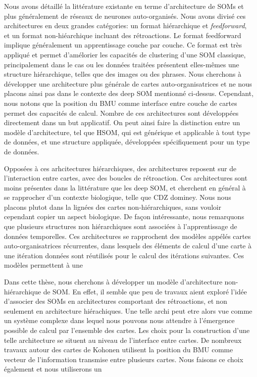 \documentclass[../main]{subfiles}
\begin{document}
Nous avons détaillé la littérature existante en terme d'architecture de SOMs et plus généralement de réseaux de neurones auto-organisés. Nous avons divisé ces architectures en deux grandes catégories: un format hiérarchique et \emph{feedforward}, et un format non-hiéarchique incluant des rétroactions.
Le format feedforward implique généralement un apprentissage couche par couche. Ce format est très appliqué et permet d'amélorier les capacités de clustering d'une SOM classique, principalement dans le cas ou les données traitées présentent elles-mêmes une structure hiérarchique, telles que des images ou des phrases.
Nous cherchons à développer une architecture plus générale de cartes auto-organisatrices et ne nous placons ainsi pas dans le contexte des deep SOM mentionné ci-dessus. 
Cependant, nous notons que la position du BMU comme interface entre couche de cartes permet des capacités de calcul.
Nombre de ces architectures sont développées directement dans un but applicatif. On peut ainsi faire la distinction entre un modèle d'architecture, tel que HSOM, qui est générique et applicable à tout type de données, et une structure appliquée, développées spécifiquement pour un type de données.

Opposées à ces arhcitectures hiérarchiques, des architectures reposent sur de l'interaction entre cartes, avec des boucles de rétroaction.
Ces architectures sont moins présentes dans la littérature que les deep SOM, et cherchent en général à se rapprocher d'un contexte biologique, telle que CDZ dominey.
Nous nous placons plutot dans la lignées des cartes non-hiérarchiques, sans vouloir cependant copier un aspect biologique.
De façon intéressante, nous remarquons que plusieurs structures non hiérarchiques sont associées à l'apprentissage de données temporelles. Ces architectures se rapprochent des modèles appélés cartes auto-organisatrices récurrentes, dans lesquels des éléments de calcul d'une carte à une itération données sont réutilisés pour le calcul des itérations suivantes. Ces modèles permettent à une 


Dans cette thèse, nous cherchons à développer un modèle d'architecture non-hiérarchique de SOM. En effet, il semble que peu de travaux aient exploré l'idée d'associer des SOMs en architectures comportant des rétroactions, et non seulement en architecture hiérachiques. 
Une telle archi peut etre alors vue comme un système complexe dans lequel nous pouvons nous attendre à l'émergence possible de calcul par l'ensemble des cartes.
Les choix pour la construction d'une telle architecture se situent au niveau de l'interface entre cartes. De nombreux travaux autour des cartes de Kohonen utilisent la position du BMU comme vecteur de l'information transmise entre plusieurs cartes. 
Nous faisons ce choix également et nous utiliserons un
\end{document}
